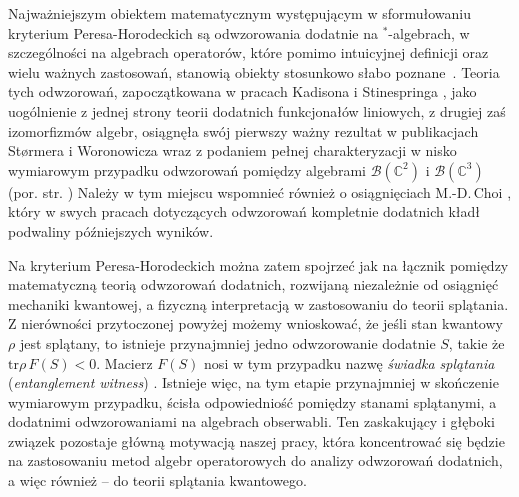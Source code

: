 Najważniejszym obiektem matematycznym występującym w sformułowaniu
kryterium Peresa-Horodeckich są odwzorowania dodatnie na $^{*}$-algebrach,
w szczególności na algebrach operatorów,
które pomimo intuicyjnej definicji oraz wielu ważnych zastosowań,
stanowią obiekty stosunkowo słabo
\mbox{poznane \cite{Stormer2013}}.
Teoria tych odwzorowań, zapoczątkowana w pracach
Kadisona \cite{kadison1952generalized}
i Stinespringa
\cite{stinespring1955positive},
jako uogólnienie z jednej strony teorii dodatnich funkcjonałów liniowych,
z drugiej zaś izomorfizmów algebr,
osiągnęła swój pierwszy ważny rezultat w publikacjach Størmera i Woronowicza
\cite{stormer1963positive,woronowicz1976positive}
wraz z podaniem pełnej charakteryzacji w nisko wymiarowym przypadku
odwzorowań pomiędzy algebrami $\mathcal{B}(\mathbb{C}^{2})$ i $\mathcal{B}(\mathbb{C}^{3})$
(por. str. \pageref{thm:PositiveMapsOnM2})
Należy w tym miejscu wspomnieć również o osiągnięciach M.-D.\,Choi
\cite{choi1975positive,choi1975completely,choi1977extremal},
który w swych pracach dotyczących odwzorowań kompletnie dodatnich
kładł podwaliny późniejszych wyników.

Na kryterium Peresa-Horodeckich można zatem spojrzeć jak na łącznik pomiędzy
matematyczną teorią odwzorowań dodatnich,
rozwijaną niezależnie od osiągnięć mechaniki kwantowej,
a fizyczną interpretacją w zastosowaniu do teorii splątania.
Z nierówności przytoczonej powyżej %
możemy wnioskować,
że jeśli stan kwantowy $\rho$ jest splątany,
to istnieje przynajmniej jedno odwzorowanie dodatnie $S$,
takie że $\text{tr} \rho \, F(S) < 0$.
Macierz $F(S)$ nosi w tym przypadku nazwę
\emph{świadka splątania} (\emph{entanglement witness})
\cite{bourennane2004experimental}.
Istnieje więc,
na tym etapie przynajmniej w skończenie wymiarowym przypadku,
ścisła odpowiedniość pomiędzy stanami splątanymi,
a dodatnimi odwzorowaniami na algebrach obserwabli.
Ten zaskakujący i głęboki związek pozostaje główną motywacją naszej pracy,
która koncentrować się będzie na zastosowaniu metod algebr operatorowych
do analizy odwzorowań dodatnich,
a więc również -- do teorii splątania kwantowego.

